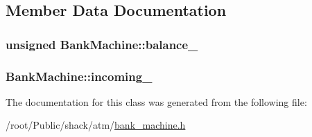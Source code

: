 \subsection{Member Data Documentation}
\hypertarget{classBankMachine_ad299fdb18b1ee6e66374f70dde18d584}{
\subsubsection[{balance\-\_\-}]{\setlength{\rightskip}{0pt plus 5cm}unsigned Bank\-Machine\-::balance\-\_\-\hspace{0.3cm}{\ttfamily [private]}}}\label{classBankMachine_ad299fdb18b1ee6e66374f70dde18d584}
\hypertarget{classBankMachine_a80fe063f235cf02d33a2d70aeef6048c}{
\subsubsection[{incoming\-\_\-}]{ Bank\-Machine\-::incoming\-\_\-\hspace{0.3cm}{\ttfamily [private]}}}\label{classBankMachine_a80fe063f235cf02d33a2d70aeef6048c}


The documentation for this class was generated from the following file\-:\begin{DoxyCompactItemize}
\item 
/root/\-Public/shack/atm/\hyperlink{bank__machine_8h}{bank\-\_\-machine.\-h}\end{DoxyCompactItemize}
